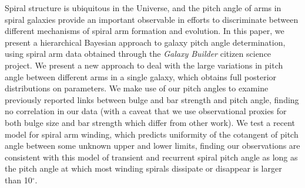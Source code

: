 Spiral structure is ubiquitous in the Universe, and the pitch angle of arms in spiral galaxies provide an important observable in efforts to discriminate between different mechanisms of spiral arm formation and evolution. In this paper, we present a hierarchical Bayesian approach to galaxy pitch angle determination, using spiral arm data obtained through the \textit{Galaxy Builder} citizen science project. We present a new approach to deal with the large variations in pitch angle between different arms in a single galaxy, which obtains full posterior distributions on parameters. We make use of our pitch angles to examine previously reported links between bulge and bar strength and pitch angle, finding no correlation in our data  (with a caveat that we use observational proxies for both bulge size and bar strength which differ from other work). We test a recent model for spiral arm winding, which predicts uniformity of the cotangent of pitch angle between some unknown upper and lower limits, finding our observations are consistent with this model of transient and recurrent spiral pitch angle as long as the pitch angle at which most winding spirals dissipate or disappear is larger than 10$^\circ$.
